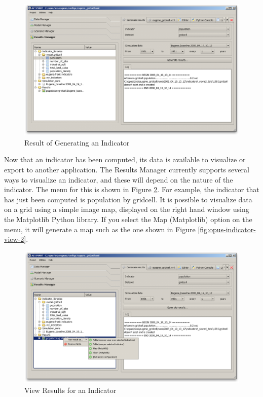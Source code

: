 \begin{figure}[htp]
\begin{center}
\includegraphics[scale=0.4]{graphics/opus-indicator-2.png}
\end{center}
\caption{Result of Generating an Indicator}
\label{fig:opus-indicator-2}
\end{figure}

Now that an indicator has been computed, its data is available to visualize or export to another application.  The Results Manager currently supports several ways to visualize an indicator, and these will depend on the nature of the indicator.  The menu for this is shown in Figure \ref{fig:opus-indicator-view-1}.  For example, the indicator that has just been computed is population by gridcell.  It is possible to visualize data on a grid using a simple image map, displayed on the right hand window using the Matplotlib Python library.   If you select the Map (Matplotlib) option on the menu, it will generate a map such as the one shown in Figure \ref{fig:opus-indicator-view-2}.

\begin{figure}[htp]
\begin{center}
\includegraphics[scale=0.4]{graphics/opus-indicator-view-1.png}
\end{center}
\caption{View Results for an Indicator}
\label{fig:opus-indicator-view-1}
\end{figure}

